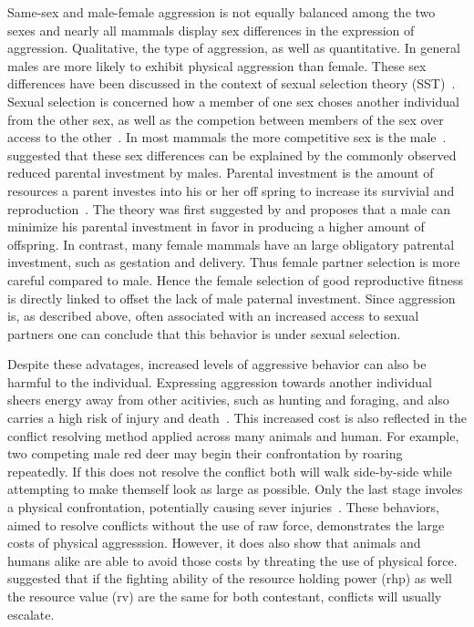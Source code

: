 Same-sex and male-female aggression is not equally balanced among the two sexes and nearly all mammals display sex differences in the expression of aggression.
Qualitative, the type of aggression, as well as quantitative.
In general males are more likely to exhibit physical aggression than female.
These sex differences have been discussed in the context of sexual selection theory (SST)~\cite{Archer2004,Anderson2002}. 
Sexual selection is concerned how a member of one sex choses another individual from the other sex, as well as the competion between members of the sex over access to the other~\cite{Darwin1859}.
In most mammals the more competitive sex is the male~\cite{Archer2009}. 
\citet{Trivers1972} suggested that these sex differences can be explained by the commonly observed reduced parental investment by males.
Parental investment is the amount of resources a parent investes into his or her off spring to increase its survivial and reproduction~\cite{Archer2009}.
The theory was first suggested by \citet{0198504403} and proposes that a male can minimize his parental investment in favor in producing a higher amount of offspring.
In contrast, many female mammals have an large obligatory patrental investment, such as gestation and delivery.
Thus female partner selection is more careful compared to male.
Hence the female selection of good reproductive fitness is directly linked to offset the lack of male paternal investment.
Since aggression is, as described above, often associated with an increased access to sexual partners one can conclude that this behavior is under sexual selection.

Despite these advatages, increased levels of aggressive behavior can also be harmful to the individual.
Expressing aggression towards another individual sheers energy away from other acitivies, such as hunting and foraging, and also carries a high risk of injury and death~\cite{Packer1995}.  
This increased cost is also reflected in the conflict resolving method applied across many animals and human.
For example, two competing male red deer may begin their confrontation by roaring repeatedly.
If this does not resolve the conflict both will walk side-by-side while attempting to make themself look as large as possible.
Only the last stage involes a physical confrontation, potentially causing sever injuries~\cite{Clutton-Brock1979a}.
These behaviors, aimed to resolve conflicts without the use of raw force, demonstrates the large costs of physical aggresssion.
However, it does also show that animals and humans alike are able to avoid those costs by threating the use of physical force.
\citet{Maxson2005} suggested that if the fighting ability of the resource holding power (\acrshort{rhp}) as well the resource value (\acrshort{rv}) are the same for both contestant, conflicts will usually escalate.

